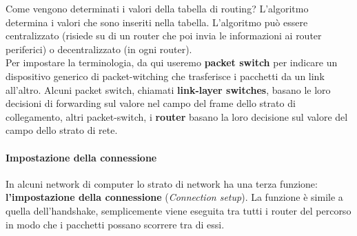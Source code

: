 \documentclass[11pt,a4paper]{article}
\begin{document}
Come vengono determinati i valori della tabella di routing? L'algoritmo determina i valori che sono inseriti nella tabella. L'algoritmo può essere centralizzato (risiede su di un router che poi invia le informazioni ai router periferici) o decentralizzato (in ogni router). \\
Per impostare la terminologia, da qui useremo \textbf{packet switch} per indicare un dispositivo generico di packet-witching che trasferisce i pacchetti da un link all'altro. Alcuni packet switch, chiamati \textbf{link-layer switches}, basano le loro decisioni di forwarding sul valore nel campo del frame dello strato di collegamento, altri packet-switch, i \textbf{router} basano la loro decisione sul valore del campo dello strato di rete.
\paragraph{Impostazione della connessione}
In alcuni network di computer lo strato di network ha una terza funzione: \textbf{l'impostazione della connessione} (\textit{Connection setup}). La funzione è simile a quella dell'handshake, semplicemente viene eseguita tra tutti i router del percorso in modo che i pacchetti possano scorrere tra di essi.
\end{document}
